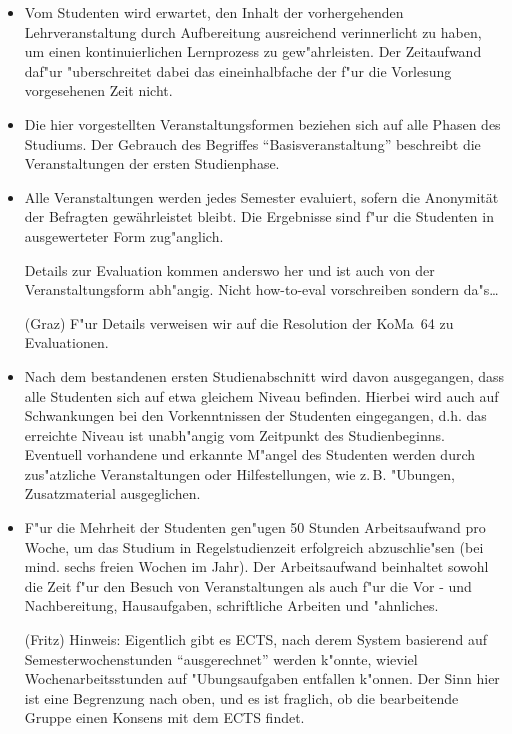 \begin{itemize}
\item	Vom Studenten wird erwartet, den Inhalt der vorhergehenden Lehrveranstaltung durch
	Aufbereitung ausreichend verinnerlicht zu haben, um einen kontinuierlichen Lernprozess
	zu gew"ahrleisten. Der Zeitaufwand daf"ur "uberschreitet dabei das 
	eineinhalbfache der f"ur die Vorlesung vorgesehenen Zeit nicht.

\item	Die hier vorgestellten Veranstaltungsformen beziehen sich auf alle Phasen des Studiums.
	Der Gebrauch des Begriffes "`Basisveranstaltung"' beschreibt die Veranstaltungen der
	ersten Studienphase.
	
\item	Alle Veranstaltungen werden jedes Semester evaluiert, sofern die Anonymität der Befragten gewährleistet bleibt. Die Ergebnisse sind f"ur die Studenten in ausgewerteter Form zug"anglich.

\begin{kcmt}\begin{komacmt}
	Details zur Evaluation kommen anderswo her und ist auch von der Veranstaltungsform abh"angig.
	Nicht how-to-eval vorschreiben sondern da"s\dots

	(Graz) F"ur Details verweisen wir auf die Resolution der KoMa~64 zu Evaluationen.
\end{komacmt}\end{kcmt}

\item	Nach dem bestandenen ersten Studienabschnitt wird davon ausgegangen, dass alle Studenten 
	sich auf etwa gleichem Niveau befinden. Hierbei wird auch auf Schwankungen bei den
	Vorkenntnissen der Studenten eingegangen, d.h. das erreichte Niveau ist unabh"angig
	vom Zeitpunkt des Studienbeginns. Eventuell vorhandene und erkannte M"angel des Studenten
	werden durch zus"atzliche Veranstaltungen oder Hilfestellungen, wie z.\,B. "Ubungen, Zusatzmaterial ausgeglichen.

\item	F"ur die Mehrheit der Studenten gen"ugen 50 Stunden Arbeitsaufwand pro Woche, um das Studium in Regelstudienzeit erfolgreich abzuschlie"sen (bei mind. sechs freien Wochen im Jahr).
	Der Arbeitsaufwand beinhaltet sowohl die Zeit f"ur den Besuch von Veranstaltungen als auch f"ur die Vor - und Nachbereitung, Hausaufgaben, schriftliche Arbeiten und "ahnliches.
\begin{kcmt}\begin{komacmt}
	(Fritz) Hinweis: Eigentlich gibt es ECTS, nach derem System basierend auf
	Semesterwochenstunden "`ausgerechnet"' werden k"onnte, wieviel Wochenarbeitsstunden auf
	"Ubungsaufgaben entfallen k"onnen. Der Sinn hier ist eine Begrenzung nach oben, und es
	ist fraglich, ob die bearbeitende Gruppe einen Konsens mit dem ECTS findet.
\end{komacmt}\end{kcmt}
\end{itemize}


